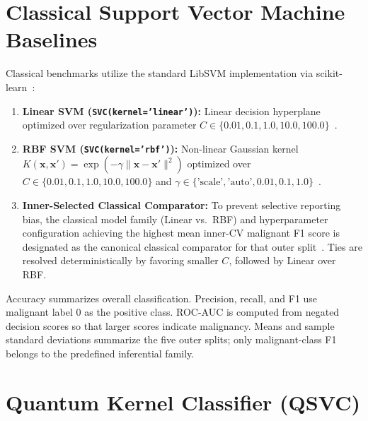 \documentclass[12pt,a4paper]{article}
\begin{document}
\section{Classical Support Vector Machine Baselines}
Classical benchmarks utilize the standard LibSVM implementation via scikit-learn~\cite{pedregosa2011scikit, chang2011libsvm}:
\begin{enumerate}
    \item \textbf{Linear SVM (\texttt{SVC(kernel='linear')}):} Linear decision hyperplane optimized over regularization parameter $C \in \{0.01, 0.1, 1.0, 10.0, 100.0\}$~\cite{cortes1995support}.
    \item \textbf{RBF SVM (\texttt{SVC(kernel='rbf')}):} Non-linear Gaussian kernel $K(\mathbf{x}, \mathbf{x}') = \exp(-\gamma \|\mathbf{x} - \mathbf{x}'\|^2)$ optimized over $C \in \{0.01, 0.1, 1.0, 10.0, 100.0\}$ and $\gamma \in \{\text{'scale'}, \text{'auto'}, 0.01, 0.1, 1.0\}$~\cite{scholkopf2002learning, guyon2002gene}.
    \item \textbf{Inner-Selected Classical Comparator:} To prevent selective reporting bias, the classical model family (Linear vs.\ RBF) and hyperparameter configuration achieving the highest mean inner-CV malignant F1 score is designated as the canonical classical comparator for that outer split~\cite{bowles2024better}. Ties are resolved deterministically by favoring smaller $C$, followed by Linear over RBF.
\end{enumerate}

Accuracy summarizes overall classification. Precision, recall, and F1 use malignant label 0 as the positive class. ROC-AUC is computed from negated decision scores so that larger scores indicate malignancy. Means and sample standard deviations summarize the five outer splits; only malignant-class F1 belongs to the predefined inferential family.

\section{Quantum Kernel Classifier (QSVC)}
\end{document}
